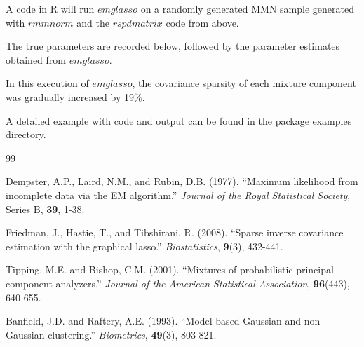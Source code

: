 \documentclass[10pt]{amsart}
\begin{document}
A code in R will run $emglasso$ on a randomly generated MMN sample generated with $rmmnorm$ and the $rspdmatrix$ code from above.

The true parameters are recorded below, followed by the parameter estimates obtained from $emglasso$. 

In this execution of $emglasso$, the covariance sparsity of each mixture component was gradually increased by 19\%. 

A detailed example with code and output can be found in the package examples directory.

\begin{thebibliography}{99}

Dempster, A.P., Laird, N.M., and Rubin, D.B. (1977).
``Maximum likelihood from incomplete data via the EM algorithm.''
\textit{Journal of the Royal Statistical Society}, Series B, \textbf{39}, 1-38.

Friedman, J., Hastie, T., and Tibshirani, R. (2008).
``Sparse inverse covariance estimation with the graphical lasso.''
\textit{Biostatistics}, \textbf{9}(3), 432-441.

Tipping, M.E. and Bishop, C.M. (2001).
``Mixtures of probabilistic principal component analyzers.''
\textit{Journal of the American Statistical Association}, \textbf{96}(443), 640-655.

Banfield, J.D. and Raftery, A.E. (1993).
``Model-based Gaussian and non-Gaussian clustering.''
\textit{Biometrics}, \textbf{49}(3), 803-821.

\end{thebibliography}
\end{document}
